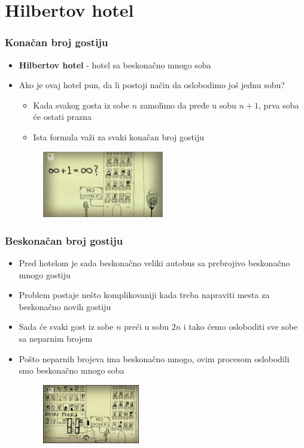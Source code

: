 \documentclass{beamer}
\begin{document}
\section{Hilbertov hotel}
\begin{frame}[fragile]\frametitle{Konačan broj gostiju}
\begin{itemize}
    \item \textbf{Hilbertov hotel} - hotel sa beskonačno mnogo soba
    \item Ako je ovaj hotel pun, da li postoji način da oslobodimo još jednu sobu?
    \begin{itemize}
        \item Kada svakog gosta iz sobe $n$ zamolimo da pređe u sobu $n+1$, prva soba će ostati prazna
        \item Ista formula važi za svaki konačan broj gostiju
    \end{itemize}
    \begin{figure}[h!]
      \centering  \includegraphics[width=0.5\textwidth]{BeskonacnoPlus1.jpg}
      \end{figure}
\end{itemize}
\end{frame}

\begin{frame}[fragile]\frametitle{Beskonačan broj gostiju}
\begin{itemize}
    \item Pred hotelom je sada beskonačno veliki autobus sa prebrojivo beskonačno mnogo gostiju
    \item Problem postaje nešto komplikovaniji kada treba napraviti mesta za beskonačno novih gostiju
    \item Sada će svaki gost iz sobe $n$ preći u sobu $2n$ i tako ćemo osloboditi sve sobe sa neparnim brojem
    \item Pošto neparnih brojeva ima beskonačno mnogo, ovim procesom oslobodili smo beskonačno mnogo soba
    \begin{figure}[h!]
      \centering  \includegraphics[width=0.4\textwidth]{BeskonacnoPlusBeskonacno.jpg}
      \end{figure}
\end{itemize}
\end{frame}
\end{document}
